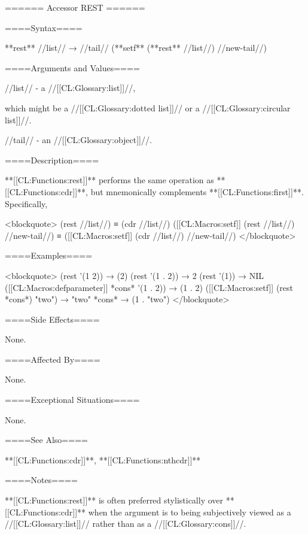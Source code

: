 ====== Accessor REST ======

====Syntax====

**rest** //list// → //tail// (**setf** (**rest** //list//) //new-tail//)

====Arguments and Values====

//list// - a //[[CL:Glossary:list]]//,

which might be a //[[CL:Glossary:dotted list]]// or a //[[CL:Glossary:circular list]]//.

//tail// - an //[[CL:Glossary:object]]//.

====Description====

**[[CL:Functions:rest]]** performs the same operation as **[[CL:Functions:cdr]]**, but mnemonically complements **[[CL:Functions:first]]**. Specifically,

<blockquote> (rest //list//) ≡ (cdr //list//) ([[CL:Macros:setf]] (rest //list//) //new-tail//) ≡ ([[CL:Macros:setf]] (cdr //list//) //new-tail//) </blockquote>

====Examples====

<blockquote> (rest '(1 2)) → (2) (rest '(1 . 2)) → 2 (rest '(1)) → NIL ([[CL:Macros:defparameter]] *cons* '(1 . 2)) → (1 . 2) ([[CL:Macros:setf]] (rest *cons*) "two") → "two" *cons* → (1 . "two") </blockquote>

====Side Effects====

None.

====Affected By====

None.

====Exceptional Situations====

None.

====See Also====

**[[CL:Functions:cdr]]**, **[[CL:Functions:nthcdr]]**

====Notes====

**[[CL:Functions:rest]]** is often preferred stylistically over **[[CL:Functions:cdr]]** when the argument is to being subjectively viewed as a //[[CL:Glossary:list]]// rather than as a //[[CL:Glossary:cons]]//.


